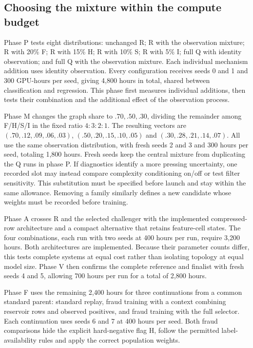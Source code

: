 \documentclass[11pt]{article}
\begin{document}
\subsection{Choosing the mixture within the compute budget}

Phase P tests eight distributions: unchanged R; R with the observation mixture; R with 20\% F; R with 15\% H; R with 10\% S; R with 5\% I; full Q with identity observation; and full Q with the observation mixture. Each individual mechanism addition uses identity observation. Every configuration receives seeds 0 and 1 and 300 GPU-hours per seed, giving 4,800 hours in total, shared between classification and regression. This phase first measures individual additions, then tests their combination and the additional effect of the observation process.

Phase M changes the graph share to $.70,.50,.30$, dividing the remainder among F/H/S/I in the fixed ratio $4:3:2:1$. The resulting vectors are $(.70,.12,.09,.06,.03)$, $(.50,.20,.15,.10,.05)$ and $(.30,.28,.21,.14,.07)$. All use the same observation distribution, with fresh seeds 2 and 3 and 300 hours per seed, totaling 1,800 hours. Fresh seeds keep the central mixture from duplicating the Q runs in phase P. If diagnostics identify a more pressing uncertainty, one recorded slot may instead compare complexity conditioning on/off or test filter sensitivity. This substitution must be specified before launch and stay within the same allowance. Removing a family similarly defines a new candidate whose weights must be recorded before training.

Phase A crosses R and the selected challenger with the implemented compressed-row architecture and a compact alternative that retains feature-cell states. The four combinations, each run with two seeds at 400 hours per run, require 3,200 hours. Both architectures are implemented. Because their parameter counts differ, this tests complete systems at equal cost rather than isolating topology at equal model size. Phase V then confirms the complete reference and finalist with fresh seeds 4 and 5, allowing 700 hours per run for a total of 2,800 hours.

Phase F uses the remaining 2,400 hours for three continuations from a common standard parent: standard replay, fraud training with a context combining reservoir rows and observed positives, and fraud training with the full selector. Each continuation uses seeds 6 and 7 at 400 hours per seed. Both fraud comparisons hide the explicit hard-negative flag H, follow the permitted label-availability rules and apply the correct population weights.
\end{document}
